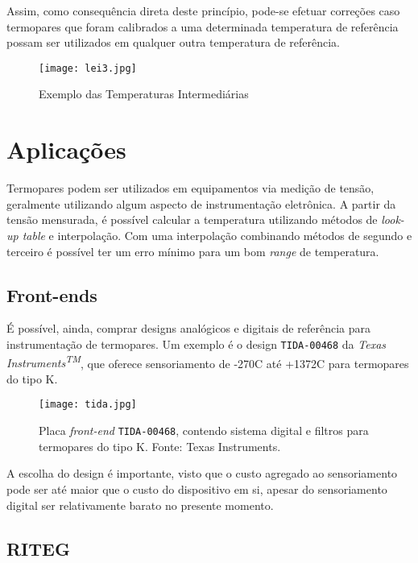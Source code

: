 \documentclass[a4paper,12pt]{report}
\begin{document}
	\singlespacing
	
	Assim, como consequência direta deste princípio, pode-se efetuar correções caso termopares que foram calibrados a uma determinada temperatura de referência possam ser utilizados em qualquer outra temperatura de referência.
	
	\begin{figure}[htbp]
		\centering
		\texttt{[image: lei3.jpg]}
		\caption{Exemplo das Temperaturas Intermediárias}
		\label{lei3}
	\end{figure}
	
	\chapter{Aplicações}
	
	Termopares podem ser utilizados em equipamentos via medição de tensão, geralmente utilizando algum aspecto de instrumentação eletrônica. A partir da tensão mensurada, é possível calcular a temperatura utilizando métodos de \textit{look-up table} e interpolação. Com uma interpolação combinando métodos de segundo e terceiro é possível ter um erro mínimo para um bom \textit{range} de temperatura. 
	
	\section{Front-ends}
	
	É possível, ainda, comprar designs analógicos e digitais de referência para instrumentação de termopares. Um exemplo é o design \texttt{TIDA-00468} da \textit{Texas Instruments\textsuperscript{TM}}, que oferece sensoriamento de -270\degree C até +1372\degree C para termopares do tipo K.
	
	\begin{figure}[H]
		\centering
		\texttt{[image: tida.jpg]}\\
		\caption{Placa \textit{front-end} \texttt{TIDA-00468}, contendo sistema digital e filtros para termopares do tipo K. Fonte: Texas Instruments.}
	\end{figure}
	
	A escolha do design é importante, visto que o custo agregado ao sensoriamento pode ser até maior que o custo do dispositivo em si, apesar do sensoriamento digital ser relativamente barato no presente momento.
	
	\section{RITEG}
	
\end{document}
